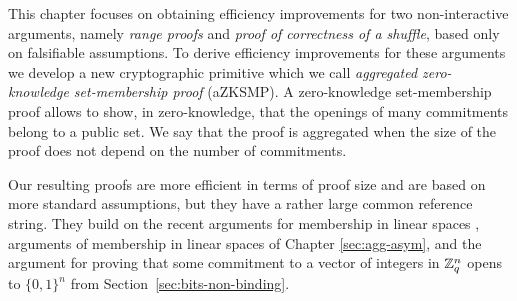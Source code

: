 This chapter focuses on obtaining efficiency improvements for two non-interactive arguments, namely \emph{range proofs} and \emph{proof of correctness of a shuffle}, based only on falsifiable assumptions.  To derive efficiency improvements for these arguments we develop a new cryptographic primitive which we call \emph{aggregated zero-knowledge set-membership proof} (aZKSMP). A zero-knowledge set-membership proof allows to show, in zero-knowledge, that the openings of many commitments belong to a public set. We say that the proof is {aggregated} when the size of the proof does not depend on the number of commitments.

Our resulting proofs are more efficient in terms of proof size and are based on more standard assumptions, but they have a rather large common reference string. They build on the recent arguments for membership in linear spaces \cite{EC:LPJY14,C:JutRoy14,EC:KilWee15}, arguments of membership in linear spaces of Chapter \ref{sec:agg-asym}, and the argument for proving that some commitment to a vector of integers in $\mathbb{Z}_q^{n}$ opens to $\{0,1\}^n$ from Section~\ref{sec:bits-non-binding}.
 
